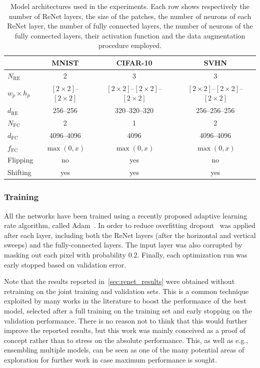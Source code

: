 \begin{table}[t]
    \centering
    \begin{tabular}{l || c | c | c }
        & MNIST & CIFAR-10 & SVHN \\
        \hline
        \hline
    $N_{\text{RE}}$ & 2 & 3 & 3 \\
        \hline
        $w_p \times h_p$ & $[2\times 2]$--$[2 \times 2]$ & $[2\times 2]$--$[2 \times 2]$--$[2
        \times 2]$ & $[2\times 2]$--$[2 \times 2]$--$[2 \times 2]$ \\
        \hline
    $d_{\text{RE}}$ & 256--256 & 320--320--320 & 256--256--256 \\
        \hline
    $N_{\text{FC}}$ & 2 & 1 & 2 \\
        \hline
    $d_{\text{FC}}$ & 4096--4096 & 4096 & 4096--4096 \\
        \hline
    $f_{\text{FC}}$ & $\max(0, x)$ & $\max(0,x)$ & $\max(0,x)$ \\
        \hline
    Flipping & no & yes & no \\
        \hline
    Shifting & yes & yes & yes \\
    \end{tabular}
    \caption{Model architectures used in the experiments. Each row shows
             respectively the number of ReNet layers, the size of the patches,
             the number of neurons of each ReNet layer, the number of fully
             connected layers, the number of neurons of the fully connected
             layers, their activation function and the data augmentation
             procedure employed.}
    \label{tbl:renet_architectures}
\end{table}

\subsubsection{Training}
All the networks have been trained using a recently proposed adaptive learning
rate algorithm, called Adam~\citep{Kingma2014}. In order to reduce overfitting
dropout~\citep{Srivastava14} was applied after each layer, including both the
ReNet layers (after the horizontal and vertical sweeps) and the fully-connected
layers. The input layer was also corrupted by masking out each pixel with
probability $0.2$. Finally, each optimization run was early stopped based
on validation error.

Note that the results reported in~\autoref{sec:renet_results} were obtained
without retraining on the joint training and validation sets. This is a common
technique exploited by many works in the literature to boost the performance
of the best model, selected after a full training on the training set and early
stopping on the validation performance. There is no reason not to think that
this would further improve the reported results, but this work was mainly
conceived as a proof of concept rather than to stress on the absolute
performance. This, as well as e.g., ensembling multiple models, can be seen as
one of the many potential areas of exploration for further work in case maximum
performance is sought.

